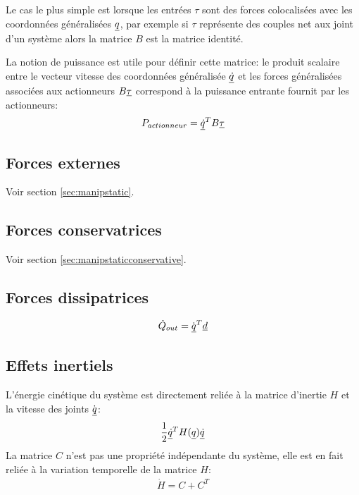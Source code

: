 Le cas le plus simple est lorsque les entrées $\tau$ sont des forces colocalisées avec les coordonnées généralisées $\underline{q}$, par exemple si $\tau$ représente des couples net aux joint d'un système alors la matrice $B$ est la matrice identité.

La notion de puissance est utile pour définir cette matrice: le produit scalaire entre le vecteur vitesse des coordonnées généralisée $\underline{\dot{q}}$ et les forces généralisées associées aux actionneurs $B\underline{\tau}$ correspond à la puissance entrante fournit par les actionneurs:
%
\begin{align}
P_{actionneur} = \underline{\dot{q}}^T B\underline{\tau}
\end{align}


\subsection{Forces externes}

Voir section \ref{sec:manipstatic}. 

\subsection{Forces conservatrices}

Voir section \ref{sec:manipstaticconservative}. 


\subsection{Forces dissipatrices}

%
\begin{align}
\dot{Q}_{out} = \dot{\underline{q}}^T \underline{d}
\end{align}
%

\subsection{Effets inertiels}
%
L'énergie cinétique du système est directement reliée à la matrice d'inertie $H$ et la vitesse des joints $\dot{\underline{q}}$:
%
\begin{align}
\frac{1}{2} \underline{\dot{q}}^T H(\underline{q}) \underline{\dot{q}} 
\label{eq:kinetic}
\end{align}
%
La matrice $C$ n'est pas une propriété indépendante du système, elle est en fait reliée à la variation temporelle de la matrice $H$:
%
\begin{align}
\dot{H} = C + C^T
\label{eq:cener}
\end{align}

